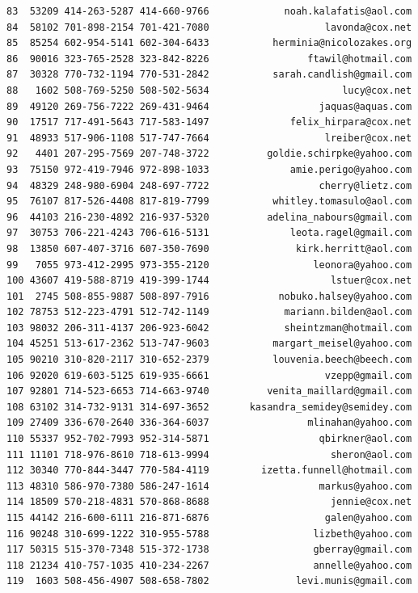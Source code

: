 \documentclass[
  12pt,
]{article}
\begin{document}
\begin{verbatim}
83  53209 414-263-5287 414-660-9766             noah.kalafatis@aol.com
84  58102 701-898-2154 701-421-7080                    lavonda@cox.net
85  85254 602-954-5141 602-304-6433           herminia@nicolozakes.org
86  90016 323-765-2528 323-842-8226                 ftawil@hotmail.com
87  30328 770-732-1194 770-531-2842           sarah.candlish@gmail.com
88   1602 508-769-5250 508-502-5634                       lucy@cox.net
89  49120 269-756-7222 269-431-9464                   jaquas@aquas.com
90  17517 717-491-5643 717-583-1497              felix_hirpara@cox.net
91  48933 517-906-1108 517-747-7664                    lreiber@cox.net
92   4401 207-295-7569 207-748-3722          goldie.schirpke@yahoo.com
93  75150 972-419-7946 972-898-1033              amie.perigo@yahoo.com
94  48329 248-980-6904 248-697-7722                   cherry@lietz.com
95  76107 817-526-4408 817-819-7799           whitley.tomasulo@aol.com
96  44103 216-230-4892 216-937-5320          adelina_nabours@gmail.com
97  30753 706-221-4243 706-616-5131              leota.ragel@gmail.com
98  13850 607-407-3716 607-350-7690               kirk.herritt@aol.com
99   7055 973-412-2995 973-355-2120                  leonora@yahoo.com
100 43607 419-588-8719 419-399-1744                     lstuer@cox.net
101  2745 508-855-9887 508-897-7916            nobuko.halsey@yahoo.com
102 78753 512-223-4791 512-742-1149             mariann.bilden@aol.com
103 98032 206-311-4137 206-923-6042             sheintzman@hotmail.com
104 45251 513-617-2362 513-747-9603           margart_meisel@yahoo.com
105 90210 310-820-2117 310-652-2379           louvenia.beech@beech.com
106 92020 619-603-5125 619-935-6661                    vzepp@gmail.com
107 92801 714-523-6653 714-663-9740          venita_maillard@gmail.com
108 63102 314-732-9131 314-697-3652       kasandra_semidey@semidey.com
109 27409 336-670-2640 336-364-6037                 mlinahan@yahoo.com
110 55337 952-702-7993 952-314-5871                   qbirkner@aol.com
111 11101 718-976-8610 718-613-9994                     sheron@aol.com
112 30340 770-844-3447 770-584-4119         izetta.funnell@hotmail.com
113 48310 586-970-7380 586-247-1614                   markus@yahoo.com
114 18509 570-218-4831 570-868-8688                     jennie@cox.net
115 44142 216-600-6111 216-871-6876                    galen@yahoo.com
116 90248 310-699-1222 310-955-5788                  lizbeth@yahoo.com
117 50315 515-370-7348 515-372-1738                  gberray@gmail.com
118 21234 410-757-1035 410-234-2267                  annelle@yahoo.com
119  1603 508-456-4907 508-658-7802               levi.munis@gmail.com

\end{verbatim}
\end{document}
